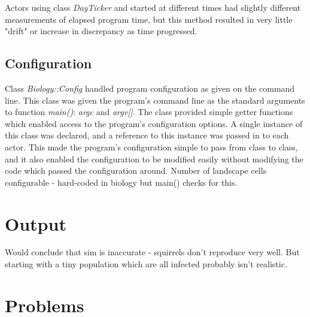 \documentclass[11pt, oneside]{article}   %
\begin{document}
Actors using class {\em DayTicker} and started at different times had slightly different measurements of elapsed program time, but this method resulted in very little "drift" or increase in discrepancy as time progressed.

\subsection{Configuration}

Class {\em Biology::Config} handled program configuration as given on the command line.
This class was given the program's command line as the standard arguments to function {\em main()}: {\em argc} and {\em argv[]}.
The class provided simple getter functions which enabled access to the program's configuration options.
A single instance of this class was declared, and a reference to this instance was passed in to each actor.
This made the program's configuration simple to pass from class to class, and it also enabled the configuration to be modified easily without modifying the code which passed the configuration around.  
Number of landscape cells configurable - hard-coded in biology but main() checks for this.

\section{Output}

Would conclude that sim is inaccurate - squirrels don't reproduce very well.
But starting with a tiny population which are all infected probably isn't realistic.

\section{Problems}
\end{document}
